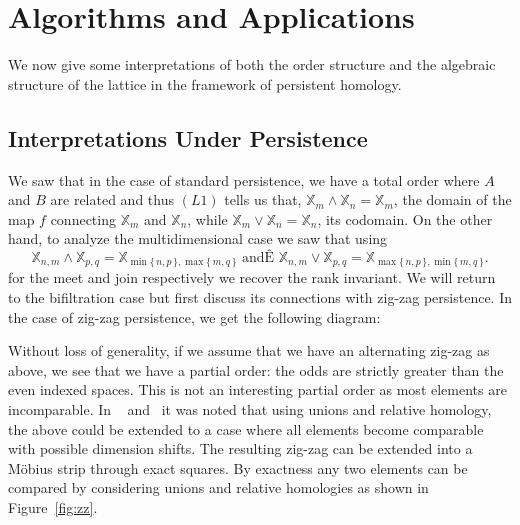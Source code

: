 \documentclass[10pt]{amsart}
\newcommand{\X}{\mathbb{X}}
\newcommand{\set}[1]{\{\,#1\,\}}
\newcommand{\Hg}{\mathrm{H}}
\begin{document}

%
\section{Algorithms and Applications}
\label{Algorithms and Applications}

We now give some interpretations of both the order structure and the algebraic structure of the lattice in the framework of persistent homology. 

\subsection{Interpretations Under Persistence}

We saw that in the case of standard persistence, we have a total order where $A$ and $B$ are related and thus $(L1)$ tells us that, $\X_{m}\wedge \X_{n}=\X_{m}$, the domain of the map $f$ connecting $\X_{m}$ and $\X_{n}$, while $\X_{m}\vee \X_{n}=\X_{n}$, its codomain.
%
On the other hand, to analyze the multidimensional case we saw that using  
\[
\X_{n,m}\wedge \X_{p,q}=\X_{\min\set{n,p},\max\set{m,q}} \text{  andÊ } \X_{n,m}\vee \X_{p,q}=\X_{\max\set{n,p},\min\set{m,q}}.
\] 
for the meet and join respectively we recover the rank invariant. 
We will return to the bifiltration case but first discuss its connections with zig-zag persistence. 
%
In the case of zig-zag persistence, we get the following diagram:

\begin{center}
\end{center}
%
Without loss of generality, if we assume that we have an alternating zig-zag as above, we see that we have a partial order: the odds are strictly greater than the even indexed spaces.  This is not an interesting partial order as most elements are incomparable. 
%
In ~\cite{Car09} and~\cite{Be12} it was noted that using unions and relative homology, the above could be extended to a case where all elements become comparable with possible dimension shifts. 
The resulting zig-zag can be extended into a M\" obius strip through exact squares. By exactness any two elements can be compared by considering unions and relative homologies as shown in Figure~\ref{fig:zz}. 
\end{document}
